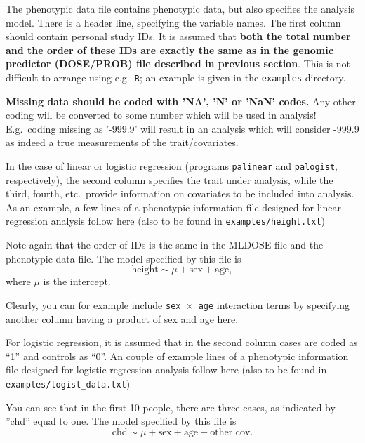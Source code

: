 \documentclass[12pt,a4paper]{article}
\begin{document}
The phenotypic data file contains phenotypic data, but also specifies
the analysis model. There is a header line, specifying the variable
names.  The first column should contain personal study IDs. It is
assumed that \textbf{both the total number and the order of these IDs
  are exactly the same as in the genomic predictor (DOSE/PROB) file
  described in previous section}. This is not difficult to arrange
using e.g.~\texttt{R}; an example is given in the \texttt{examples}
directory.

\textbf{Missing data should be coded with 'NA', 'N' or 'NaN' codes.} Any
other coding will be converted to some number which will be used in
analysis! E.g.~coding missing as '-999.9' will result in an analysis which
will consider -999.9 as indeed a true measurements of the trait/covariates.

In the case of linear or logistic regression (programs
\texttt{palinear} and \texttt{palogist}, respectively), the second
column specifies the trait under analysis, while the third, fourth,
etc.~provide information on covariates to be included into analysis.
As an example, a few lines of a phenotypic information file designed
for linear regression analysis follow here (also to be found in
\texttt{examples/height.txt})


Note again that the order of IDs is the same in the MLDOSE file
and the phenotypic data file. The model specified by this file is
\begin{equation*}
\textrm{height} \sim \mu + \textrm{sex} + \textrm{age},
\end{equation*}
where $\mu$ is the intercept.

Clearly, you can for example include \texttt{sex $\times$ age} interaction terms by
specifying another column having a product of sex and age here.

For logistic regression, it is assumed that in the second column cases are
coded as ``1'' and controls as ``0''. An couple of example lines of a phenotypic
information file designed for logistic regression analysis follow here (also
to be found in \texttt{examples/logist\_data.txt})



You can see that in the first 10 people, there are three cases, as indicated
by ''chd'' equal to one. The model specified by this file
is
\begin{equation*}
\textrm{chd} \sim \mu + \textrm{sex} + \textrm{age} +
\textrm{other cov}.
\end{equation*}
\end{document}
